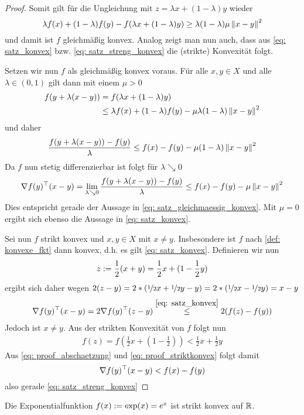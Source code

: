 \documentclass[ %
ngerman, %
a4paper, 
12pt,%
sectionreset, %
chapterstyle=framed, %
sectionstyle=pure, %
titlefont=osfamily %
]{../texmf/tex/latex/mathscriptMathTUD/mathscriptMathTUD}
\begin{document}
\begin{proof}
	Somit gilt für die Ungleichung mit $z = \lambda x + (1-\lambda) y$ wieder
	\begin{equation*}
		\lambda f(x) + (1-\lambda) f(y) - f(\lambda x + (1-\lambda) y) \geq \lambda (1-\lambda) \mu \left\lVert x-y \right\rVert^2
	\end{equation*}
	und damit ist $f$ gleichmäßig konvex. Analog zeigt man nun auch, dass aus \eqref{eq: satz_konvex} bzw. \eqref{eq: satz_streng_konvex} die (strikte) Konvexität folgt.
	
	Setzen wir nun $f$ als gleichmäßig konvex voraus. Für alle $x,y \in X$ und alle $\lambda \in (0,1)$ gilt dann mit einem $\mu > 0$
	\begin{align*}
		f(y + \lambda(x-y)) 
		&= f(\lambda x + (1-\lambda) y) \\
		&\leq \lambda f(x) + (1-\lambda) f(y) - \mu \lambda (1-\lambda) \left\lVert x-y \right\rVert^2
	\end{align*}
	und daher
	\begin{align*}
		\frac{f(y + \lambda (x-y)) - f(y)}{\lambda} \leq f(x) - f(y) - \mu (1-\lambda) \left\lVert x-y \right\rVert^2
	\end{align*}
	Da $f$ nun stetig differenzierbar ist folgt für $\lambda \searrow 0$
	\begin{align} \label{eq: proof_differenzieren}
		\nabla f(y)^{\top} (x-y) = \lim_{\lambda \searrow 0} \frac{f(y + \lambda (x-y)) - f(y)}{\lambda} \leq f(x) - f(y) - \mu \left\lVert x-y \right\rVert^2
	\end{align}
	Dies entspricht gerade der Aussage in \eqref{eq: satz_gleichmaessig_konvex}. Mit $\mu = 0$ ergibt sich ebenso die Aussage in \eqref{eq: satz_konvex}.
	
	Sei nun $f$ strikt konvex und $x,y \in X$ mit $x \neq y$. Insbesondere ist $f$ nach \cref{def: konvexe_fkt} dann konvex, d.h. es gilt \eqref{eq: satz_konvex}. Definieren wir nun
	\begin{equation*}
		z \mathrel{:=} \frac{1}{2}(x+y) = \frac{1}{2} x + (1 - \frac{1}{2} y) 
	\end{equation*}
	ergibt sich daher wegen $2(z-y) = 2 * \left( \lfrac{1}{2}x + \lfrac{1}{2}y - y \right) = 2 * \left( \lfrac{1}{2}x - \lfrac{1}{2}y  \right) = x -y$
	\begin{align} \label{eq: proof_abschaetzung}
		\nabla f(y)^{\top} (x-y) = 2 \nabla f(y)^{\top} (z-y) \overset{\eqref{eq: satz_konvex}}{\leq} 2( f(z) - f(y))
	\end{align}
	Jedoch ist $x \neq y$. Aus der strikten Konvexität von $f$ folgt nun
	\begin{align} \label{eq: proof_striktkonvex}
		f(z) = f \left( \frac{1}{2} x + \left( 1 - \frac{1}{2} \right) \right) < \frac{1}{2} x + \frac{1}{2} y
	\end{align}
	Aus \eqref{eq: proof_abschaetzung} und \eqref{eq: proof_striktkonvex} folgt damit 
	\begin{equation*}
		\nabla f(y)^{\top} (x-y) < f(x) - f(y)
	\end{equation*}
	also gerade \eqref{eq: satz_streng_konvex}
\end{proof}

\begin{beispiel}
	Die Exponentialfunktion $f(x) \mathrel{:=} \exp(x) = e^x$ ist strikt konvex auf $\mathbb{R}$.
\end{beispiel}
\end{document}
